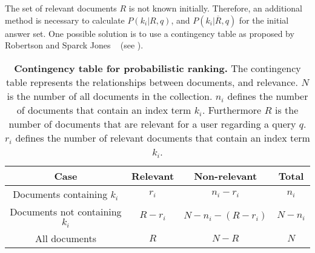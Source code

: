The set of relevant documents $R$ is not known initially. Therefore, an additional method is necessary to calculate $P(k_i|R, q)$, and $P(k_i|\overline{R}, q)$ for the initial answer set. One possible solution is to use a contingency table as proposed by Robertson and Sparck Jones ~\cite{Robertson1976} (see ).

\begin{table}[b]
    \centering
    \begin{tabular}{ c c c c}
      \toprule
      \textbf{Case} & \textbf{Relevant} & \textbf{Non-relevant} & \textbf{Total} \\ \midrule
      Documents containing $k_i$ & $r_i$ & $n_i - r_i$ & $n_i$ \\
      Documents not containing $k_i$ & $R - r_i$ & $N - n_i - (R - r_i)$ & $N - n_i$ \\
      All documents & $R$ & $N - R$ & $N$ \\
      \bottomrule
    \end{tabular}
  \caption[Contingency table for probabilistic ranking]{\textbf{Contingency table for probabilistic ranking.} The contingency table represents the relationships between documents, and relevance. $N$ is the number of all documents in the collection. $n_i$ defines the number of documents that contain an index term $k_i$. Furthermore $R$ is the number of documents that are relevant for a user regarding a query $q$. $r_i$ defines the number of relevant documents that contain an index term $k_i$.}
  \label{tbl:contingency_table_probabilistic_ranking}
\end{table}

